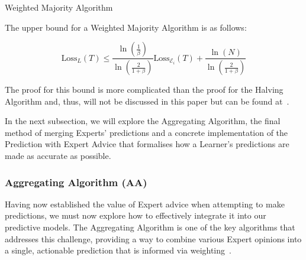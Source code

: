 \begin{algorithm}[ht]
    \caption{Weighted Majority Algorithm}\label{weighted_majority_algorithm}
    \begin{algorithmic}[1]
    \end{algorithmic}
\end{algorithm}

The upper bound for a Weighted Majority Algorithm is as follows:

\begin{equation}
    \text{Loss}_L(T) \leq \frac{\ln (\frac{1}{\beta})}{\ln (\frac{2}{1 + \beta})} \text{Loss}_{\mathcal{E}_i}(T) + \frac{\ln(N)}{\ln(\frac{2}{1+\beta})}
\end{equation}

The proof for this bound is more complicated than the proof for the Halving Algorithm and, thus, will not be discussed in this paper but can be found at~\cite{littlestone:1994}.

In the next subsection, we will explore the Aggregating Algorithm, the final method of merging Experts' predictions and a concrete implementation of the Prediction with Expert Advice that formalises how a Learner's predictions are made as accurate as possible.

\subsubsection{Aggregating Algorithm (AA)}\label{subsubsection:aggregating_algorithm}
Having now established the value of Expert advice when attempting to make predictions, we must now explore how to effectively integrate it into our predictive models. The Aggregating Algorithm is one of the key algorithms that addresses this challenge, providing a way to combine various Expert opinions into a single, actionable prediction that is informed via weighting~\cite{vovk:1990}.

